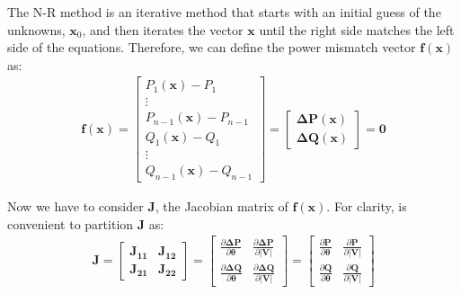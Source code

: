 \documentclass[a4paper,11pt, titlepage, twoside]{article}
\begin{document}
The N-R method is an iterative method that starts with an initial guess of the unknowns, $\mathbf{x}_0$, and then iterates the vector $\mathbf{x}$ until the right side matches the left side of the equations. Therefore, we
can define the power mismatch vector $\mathbf{f(x)}$ as:
\begin{equation}
\begin{aligned}
    \mathbf{f(x)} = \begin{bmatrix}
    P_1(\mathbf{x}) - P_1 \\
    \vdots \\
    P_{n-1}(\mathbf{x}) - P_{n-1} \\
    Q_1(\mathbf{x}) - Q_1 \\
    \vdots \\
    Q_{n-1}(\mathbf{x}) - Q_{n-1}
    \end{bmatrix} = \begin{bmatrix}
    \mathbf{\Delta P(\mathbf{x})} \\
    \mathbf{\Delta Q(\mathbf{x})}
    \end{bmatrix} = \mathbf{0}
\end{aligned}
\label{powermismatch}
\end{equation}


Now we have to consider $\mathbf{J}$, the Jacobian matrix of $\mathbf{f(x)}$. For clarity, is convenient to partition $\mathbf{J}$ as:
\begin{equation}
\begin{aligned}
    \mathbf{J} = \begin{bmatrix}
    \mathbf{J_{11}} & \mathbf{J_{12}} \\
    \mathbf{J_{21}} & \mathbf{J_{22}}
    \end{bmatrix} = \begin{bmatrix}
        \frac{\partial \mathbf{\Delta P}}{\partial \mathbf{\theta}} & \frac{\partial \mathbf{\Delta P}}{\partial \mathbf{|V|}} \\
        \frac{\partial \mathbf{\Delta Q}}{\partial \mathbf{\theta}} & \frac{\partial \mathbf{\Delta Q}}{\partial \mathbf{|V|}}
    \end{bmatrix} = \begin{bmatrix}
    \frac{\partial \mathbf{P}}{\partial \mathbf{\theta}} & \frac{\partial \mathbf{P}}{\partial \mathbf{|V|}} \\
    \frac{\partial \mathbf{Q}}{\partial \mathbf{\theta}} & \frac{\partial \mathbf{Q}}{\partial \mathbf{|V|}}
    \end{bmatrix}
\end{aligned}
\end{equation}
\end{document}
